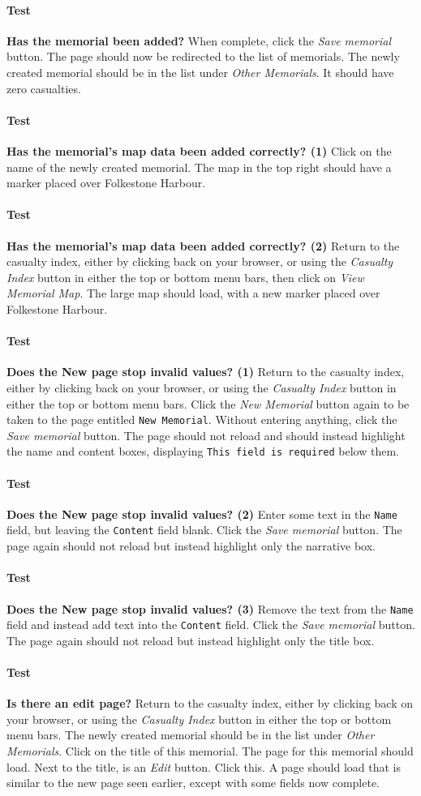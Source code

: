\documentclass[12pt]{article}
\newcounter{Test}
\newcommand{\test}[1]{%
\stepcounter{Test}%
\paragraph{Test \theTest} \textbf{#1} }
\begin{document}
\test{Has the memorial been added?}
When complete, click the \textit{Save memorial} button. The page should now be redirected to the list of memorials. The newly created memorial should be in the list under \textit{Other Memorials}. It should have zero casualties.

\test{Has the memorial's map data been added correctly? (1)}
Click on the name of the newly created memorial. The map in the top right should have a marker placed over Folkestone Harbour.

\test{Has the memorial's map data been added correctly? (2)}
Return to the casualty index, either by clicking back on your browser, or using the \textit{Casualty Index} button in either the top or bottom menu bars, then click on \textit{View Memorial Map}. The large map should load, with a new marker placed over Folkestone Harbour. 

\test{Does the New page stop invalid values? (1)}
Return to the casualty index, either by clicking back on your browser, or using the \textit{Casualty Index} button in either the top or bottom menu bars. Click the \textit{New Memorial} button again to be taken to the page entitled \texttt{New Memorial}. Without entering anything, click the \textit{Save memorial} button. The page should not reload and should instead highlight the name and content boxes, displaying \texttt{This field is required} below them.

\test{Does the New page stop invalid values? (2)}
Enter some text in the \texttt{Name} field, but leaving the \texttt{Content} field blank. Click the \textit{Save memorial} button. The page again should not reload but instead highlight only the narrative box.

\test{Does the New page stop invalid values? (3)}
Remove the text from the \texttt{Name} field and instead add text into the \texttt{Content} field. Click the \textit{Save memorial} button. The page again should not reload but instead highlight only the title box.

\test{Is there an edit page?}
Return to the casualty index, either by clicking back on your browser, or using the \textit{Casualty Index} button in either the top or bottom menu bars. The newly created memorial should be in the list under \textit{Other Memorials}. Click on the title of this memorial. The page for this memorial should load. Next to the title, is an \textit{Edit} button. Click this. A page should load that is similar to the new page seen earlier, except with some fields now complete.
\end{document}
